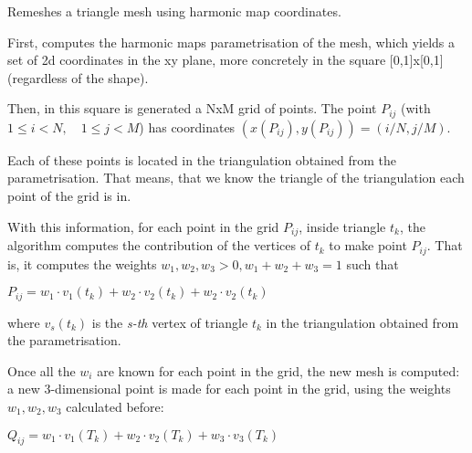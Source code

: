 Remeshes a triangle mesh using harmonic map coordinates. 

First, computes the harmonic maps parametrisation of the mesh, which yields a set of 2d coordinates in the xy plane, more concretely in the square \mbox{[}0,1\mbox{]}x\mbox{[}0,1\mbox{]} (regardless of the shape).

Then, in this square is generated a NxM grid of points. The point $P_{ij}$ (with $1\le i < N, \quad 1\le j < M$) has coordinates $(x(P_{ij}), y(P_{ij})) = (i/N, j/M)$.

Each of these points is located in the triangulation obtained from the parametrisation. That means, that we know the triangle of the triangulation each point of the grid is in.

With this information, for each point in the grid $P_{ij}$, inside triangle $t_k$, the algorithm computes the contribution of the vertices of $t_k$ to make point $P_{ij}$. That is, it computes the weights $w_1,w_2,w_3 > 0, w_1 + w_2 + w_3 = 1$ such that

$ P_{ij} = w_1 \cdot v_1(t_k) + w_2 \cdot v_2(t_k) + w_2 \cdot v_2(t_k) $

where $v_s(t_k)$ is the {\itshape s-\/th} vertex of triangle $t_k$ in the triangulation obtained from the parametrisation.

Once all the $w_i$ are known for each point in the grid, the new mesh is computed\+: a new 3-\/dimensional point is made for each point in the grid, using the weights $w_1,w_2,w_3$ calculated before\+:

$ Q_{ij} = w_1 \cdot v_1(T_k) + w_2 \cdot v_2(T_k) + w_3 \cdot v_3(T_k) $

